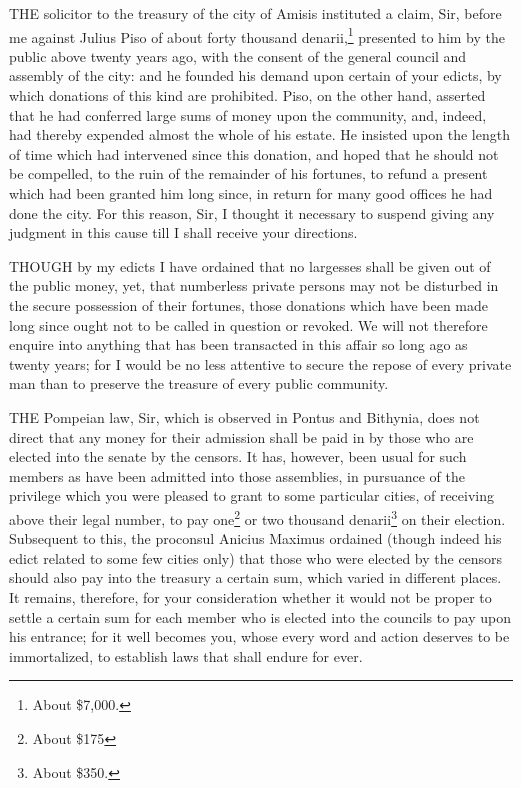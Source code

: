 THE solicitor to the treasury of the city of Amisis instituted a claim,
Sir, before me against Julius Piso of about forty thousand denarii,\footnote{About \$7,000.}
presented to him by the public above twenty years ago, with the consent of
the general council and assembly of the city: and he founded his demand
upon certain of your edicts, by which donations of this kind are
prohibited. Piso, on the other hand, asserted that he had conferred large
sums of money upon the community, and, indeed, had thereby expended almost
the whole of his estate. He insisted upon the length of time which had
intervened since this donation, and hoped that he should not be compelled,
to the ruin of the remainder of his fortunes, to refund a present which
had been granted him long since, in return for many good offices he had
done the city. For this reason, Sir, I thought it necessary to suspend
giving any judgment in this cause till I shall receive your directions.


THOUGH by my edicts I have ordained that no largesses shall be given out
of the public money, yet, that numberless private persons may not be
disturbed in the secure possession of their fortunes, those donations
which have been made long since ought not to be called in question or
revoked. We will not therefore enquire into anything that has been
transacted in this affair so long ago as twenty years; for I would be no
less attentive to secure the repose of every private man than to preserve
the treasure of every public community.


THE Pompeian law, Sir, which is observed in Pontus and Bithynia, does not
direct that any money for their admission shall be paid in by those who
are elected into the senate by the censors. It has, however, been usual
for such members as have been admitted into those assemblies, in pursuance
of the privilege which you were pleased to grant to some particular
cities, of receiving above their legal number, to pay one\footnote{About \$175}
or two thousand denarii\footnote{About \$350.} on their election. Subsequent to this,
the proconsul Anicius Maximus ordained (though indeed his edict related to
some few cities only) that those who were elected by the censors should
also pay into the treasury a certain sum, which varied in different
places. It remains, therefore, for your consideration whether it would not
be proper to settle a certain sum for each member who is elected into the
councils to pay upon his entrance; for it well becomes you, whose every
word and action deserves to be immortalized, to establish laws that shall
endure for ever.

